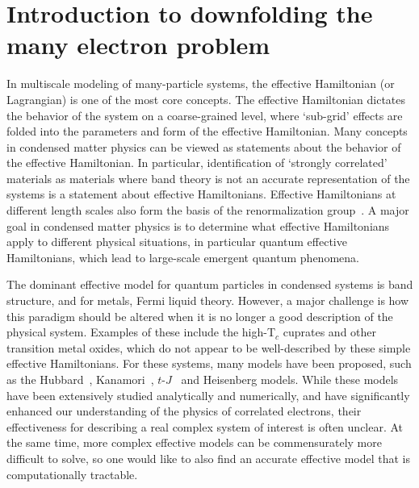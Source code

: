 \documentclass[aps, prb, 11pt]{revtex4-1}
\begin{document}
\section{Introduction to downfolding the many electron problem}

In multiscale modeling of many-particle systems, the effective Hamiltonian (or Lagrangian) is one of the most core concepts. 
The effective Hamiltonian dictates the behavior of the system on a coarse-grained level, where `sub-grid' effects are folded into the parameters and form of the effective Hamiltonian. 
Many concepts in condensed matter physics can be viewed as statements about the behavior of the effective Hamiltonian. 
In particular, identification of `strongly correlated' materials as materials where band theory is not an accurate representation of the systems is a statement about effective Hamiltonians.
Effective Hamiltonians at different length scales also form the basis of the renormalization group~\cite{Wilson}.
A major goal in condensed matter physics is to determine what effective Hamiltonians apply to different physical situations, in particular quantum effective Hamiltonians, which lead to large-scale emergent quantum phenomena. 

The dominant effective model for quantum particles in condensed systems is band structure, and for metals, Fermi liquid theory. 
However, a major challenge is how this paradigm should be altered when it is no longer a good description of the physical system.
Examples of these include the high-T$_c$ cuprates and other transition metal oxides, which do not appear to be well-described by these simple effective Hamiltonians. 
For these systems, many models have been proposed, such as the Hubbard~\cite{Hubbard1963}, Kanamori~\cite{Kanamori1963}, $t$-$J$~\cite{tJSpalek} and Heisenberg models.
While these models have been extensively studied analytically and numerically, and have significantly enhanced our understanding of the physics of correlated electrons, their effectiveness for describing a real complex system of interest is often unclear. 
At the same time, more complex effective models can be commensurately more difficult to solve, so one would like to also find an accurate effective model that is computationally tractable.
\end{document}
